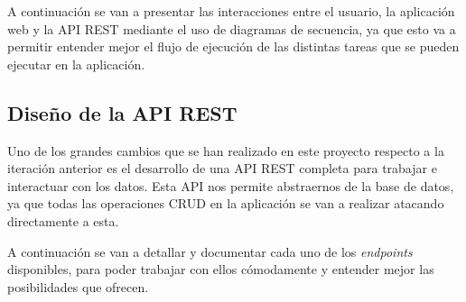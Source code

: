 A continuación se van a presentar las interacciones entre el usuario, la aplicación web y la API REST mediante el uso de diagramas de secuencia, ya que esto va a permitir entender mejor el flujo de ejecución de las distintas tareas que se pueden ejecutar en la aplicación.











\subsection{Diseño de la API REST}

Uno de los grandes cambios que se han realizado en este proyecto respecto a la iteración anterior es el desarrollo de una API REST completa para trabajar e interactuar con los datos. Esta API nos permite abstraernos de la base de datos, ya que todas las operaciones CRUD en la aplicación se van a realizar atacando directamente a esta.

A continuación se van a detallar y documentar cada uno de los \textit{endpoints} disponibles, para poder trabajar con ellos cómodamente y entender mejor las posibilidades que ofrecen.

\newpage


